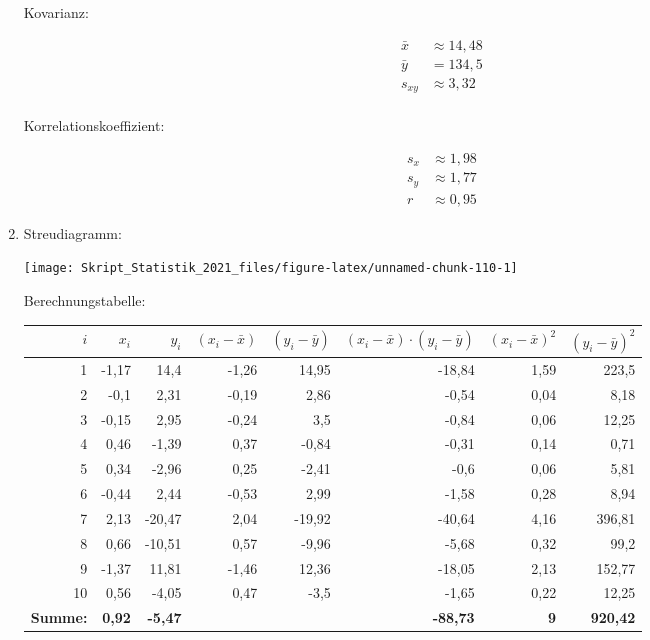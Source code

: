 \documentclass[
  11pt,
  ngerman,
  a4paper,
]{report}
\begin{document}
\begin{enumerate}
  Kovarianz:

  \[\begin{aligned}
   \bar{x} &\approx 14{,}48\\
   \bar{y} &=134{,}5\\
   s_{xy}&\approx 3{,}32\\
   \end{aligned}\]

  Korrelationskoeffizient:

  \[\begin{aligned}
   s_x &\approx 1{,}98\\
   s_y &\approx 1{,}77\\
   r &\approx 0{,}95
   \end{aligned}\]
\item
  Streudiagramm:

  \begin{center}\texttt{[image: Skript\_Statistik\_2021\_files/figure-latex/unnamed-chunk-110-1]} \end{center}

  Berechnungstabelle:

  \begin{table}[H]
   \centering
   \begin{tabular}{rrrrrrrr}
   \toprule
   \textbf{$i$} & \textbf{$x_i$} & \textbf{$y_i$} & \textbf{$(x_i-\bar{x})$} & \textbf{$(y_i-\bar{y})$} & \textbf{$(x_i-\bar{x})\cdot(y_i-\bar{y})$} & \textbf{$(x_i-\bar{x})^2$} & \textbf{$(y_i-\bar{y})^2$}\\
   \midrule
   1 & -1,17 & 14,4 & -1,26 & 14,95 & -18,84 & 1,59 & 223,5\\
   2 & -0,1 & 2,31 & -0,19 & 2,86 & -0,54 & 0,04 & 8,18\\
   3 & -0,15 & 2,95 & -0,24 & 3,5 & -0,84 & 0,06 & 12,25\\
   4 & 0,46 & -1,39 & 0,37 & -0,84 & -0,31 & 0,14 & 0,71\\
   5 & 0,34 & -2,96 & 0,25 & -2,41 & -0,6 & 0,06 & 5,81\\
   6 & -0,44 & 2,44 & -0,53 & 2,99 & -1,58 & 0,28 & 8,94\\
   7 & 2,13 & -20,47 & 2,04 & -19,92 & -40,64 & 4,16 & 396,81\\
   8 & 0,66 & -10,51 & 0,57 & -9,96 & -5,68 & 0,32 & 99,2\\
   9 & -1,37 & 11,81 & -1,46 & 12,36 & -18,05 & 2,13 & 152,77\\
   10 & 0,56 & -4,05 & 0,47 & -3,5 & -1,65 & 0,22 & 12,25\\
   \midrule
   \textbf{Summe:} & \textbf{0,92} & \textbf{-5,47} & \textbf{} & \textbf{} & \textbf{-88,73} & \textbf{9} & \textbf{920,42}\\
   \bottomrule
   \end{tabular}
   \end{table}


\end{enumerate}
\end{document}
